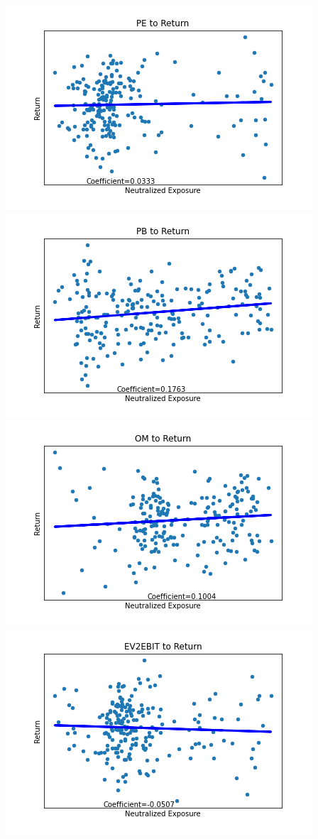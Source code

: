\documentclass{article}
\begin{document}
\begin{center}
\includegraphics[scale=0.5]{rPE.png}
\includegraphics[scale=0.5]{rPB.png}\\
\includegraphics[scale=0.5]{rOM.png}
\includegraphics[scale=0.5]{rEV2EBIT.png}\\

\end{center}
\end{document}
